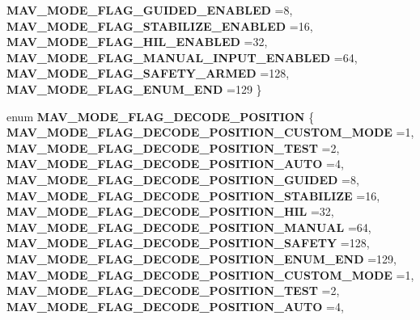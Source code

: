 \begin{DoxyCompactItemize}
\textbf{ M\+A\+V\+\_\+\+M\+O\+D\+E\+\_\+\+F\+L\+A\+G\+\_\+\+G\+U\+I\+D\+E\+D\+\_\+\+E\+N\+A\+B\+L\+ED} =8, 
\textbf{ M\+A\+V\+\_\+\+M\+O\+D\+E\+\_\+\+F\+L\+A\+G\+\_\+\+S\+T\+A\+B\+I\+L\+I\+Z\+E\+\_\+\+E\+N\+A\+B\+L\+ED} =16, 
\textbf{ M\+A\+V\+\_\+\+M\+O\+D\+E\+\_\+\+F\+L\+A\+G\+\_\+\+H\+I\+L\+\_\+\+E\+N\+A\+B\+L\+ED} =32, 
\textbf{ M\+A\+V\+\_\+\+M\+O\+D\+E\+\_\+\+F\+L\+A\+G\+\_\+\+M\+A\+N\+U\+A\+L\+\_\+\+I\+N\+P\+U\+T\+\_\+\+E\+N\+A\+B\+L\+ED} =64, 
\newline
\textbf{ M\+A\+V\+\_\+\+M\+O\+D\+E\+\_\+\+F\+L\+A\+G\+\_\+\+S\+A\+F\+E\+T\+Y\+\_\+\+A\+R\+M\+ED} =128, 
\textbf{ M\+A\+V\+\_\+\+M\+O\+D\+E\+\_\+\+F\+L\+A\+G\+\_\+\+E\+N\+U\+M\+\_\+\+E\+ND} =129
 \}
\item 
enum \textbf{ M\+A\+V\+\_\+\+M\+O\+D\+E\+\_\+\+F\+L\+A\+G\+\_\+\+D\+E\+C\+O\+D\+E\+\_\+\+P\+O\+S\+I\+T\+I\+ON} \{ \newline
\textbf{ M\+A\+V\+\_\+\+M\+O\+D\+E\+\_\+\+F\+L\+A\+G\+\_\+\+D\+E\+C\+O\+D\+E\+\_\+\+P\+O\+S\+I\+T\+I\+O\+N\+\_\+\+C\+U\+S\+T\+O\+M\+\_\+\+M\+O\+DE} =1, 
\textbf{ M\+A\+V\+\_\+\+M\+O\+D\+E\+\_\+\+F\+L\+A\+G\+\_\+\+D\+E\+C\+O\+D\+E\+\_\+\+P\+O\+S\+I\+T\+I\+O\+N\+\_\+\+T\+E\+ST} =2, 
\textbf{ M\+A\+V\+\_\+\+M\+O\+D\+E\+\_\+\+F\+L\+A\+G\+\_\+\+D\+E\+C\+O\+D\+E\+\_\+\+P\+O\+S\+I\+T\+I\+O\+N\+\_\+\+A\+U\+TO} =4, 
\textbf{ M\+A\+V\+\_\+\+M\+O\+D\+E\+\_\+\+F\+L\+A\+G\+\_\+\+D\+E\+C\+O\+D\+E\+\_\+\+P\+O\+S\+I\+T\+I\+O\+N\+\_\+\+G\+U\+I\+D\+ED} =8, 
\newline
\textbf{ M\+A\+V\+\_\+\+M\+O\+D\+E\+\_\+\+F\+L\+A\+G\+\_\+\+D\+E\+C\+O\+D\+E\+\_\+\+P\+O\+S\+I\+T\+I\+O\+N\+\_\+\+S\+T\+A\+B\+I\+L\+I\+ZE} =16, 
\textbf{ M\+A\+V\+\_\+\+M\+O\+D\+E\+\_\+\+F\+L\+A\+G\+\_\+\+D\+E\+C\+O\+D\+E\+\_\+\+P\+O\+S\+I\+T\+I\+O\+N\+\_\+\+H\+IL} =32, 
\textbf{ M\+A\+V\+\_\+\+M\+O\+D\+E\+\_\+\+F\+L\+A\+G\+\_\+\+D\+E\+C\+O\+D\+E\+\_\+\+P\+O\+S\+I\+T\+I\+O\+N\+\_\+\+M\+A\+N\+U\+AL} =64, 
\textbf{ M\+A\+V\+\_\+\+M\+O\+D\+E\+\_\+\+F\+L\+A\+G\+\_\+\+D\+E\+C\+O\+D\+E\+\_\+\+P\+O\+S\+I\+T\+I\+O\+N\+\_\+\+S\+A\+F\+E\+TY} =128, 
\newline
\textbf{ M\+A\+V\+\_\+\+M\+O\+D\+E\+\_\+\+F\+L\+A\+G\+\_\+\+D\+E\+C\+O\+D\+E\+\_\+\+P\+O\+S\+I\+T\+I\+O\+N\+\_\+\+E\+N\+U\+M\+\_\+\+E\+ND} =129, 
\textbf{ M\+A\+V\+\_\+\+M\+O\+D\+E\+\_\+\+F\+L\+A\+G\+\_\+\+D\+E\+C\+O\+D\+E\+\_\+\+P\+O\+S\+I\+T\+I\+O\+N\+\_\+\+C\+U\+S\+T\+O\+M\+\_\+\+M\+O\+DE} =1, 
\textbf{ M\+A\+V\+\_\+\+M\+O\+D\+E\+\_\+\+F\+L\+A\+G\+\_\+\+D\+E\+C\+O\+D\+E\+\_\+\+P\+O\+S\+I\+T\+I\+O\+N\+\_\+\+T\+E\+ST} =2, 
\textbf{ M\+A\+V\+\_\+\+M\+O\+D\+E\+\_\+\+F\+L\+A\+G\+\_\+\+D\+E\+C\+O\+D\+E\+\_\+\+P\+O\+S\+I\+T\+I\+O\+N\+\_\+\+A\+U\+TO} =4, 

\end{DoxyCompactItemize}
